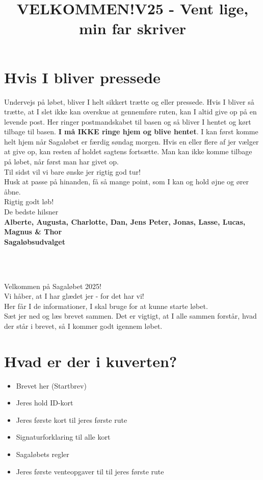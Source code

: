 \section{Hvis I bliver pressede}
Undervejs på løbet, bliver I helt sikkert trætte og eller pressede. Hvis I bliver så trætte, at I slet ikke kan overskue at gennemføre ruten, kan I altid give op på en levende post. Her ringer postmandskabet til basen og så bliver I hentet og kørt tilbage til basen. \textbf{I må IKKE ringe hjem og blive hentet}. I kan først komme helt hjem når Sagaløbet er færdig søndag morgen. Hvis en eller flere af jer vælger at give op, kan resten af holdet sagtens fortsætte. Man kan ikke komme tilbage på løbet, når først man har givet op.\\
\newline
Til sidst vil vi bare ønske jer rigtig god tur!\\
Husk at passe på hinanden, få så mange point, som I kan og hold øjne og ører åbne.\\
\newline
Rigtig godt løb!\\
\newline
\textcolor{søblå}{De bedste hilsner}\\
\textcolor{natblå}{\textbf{Alberte, Augusta, Charlotte, Dan, Jens Peter, Jonas, Lasse, Lucas, Magnus \& Thor}}\\
\textcolor{natblå}{\textbf{Sagaløbsudvalget}}\\
\newpage
\title{VELKOMMEN!}\\
\newline
\title{\textcolor{søblå}{V25 - Vent lige, min far skriver }}\\
\newline
Velkommen på Sagaløbet 2025!\\
Vi håber, at I har glædet jer - for det har vi!\\
Her får I de informationer, I skal bruge for at kunne starte løbet.\\
Sæt jer ned og læs brevet sammen. Det er vigtigt, at I alle sammen forstår, hvad der står i brevet, så I kommer godt igennem løbet.
\section{Hvad er der i kuverten?}
\begin{itemize}
    \item Brevet her (Startbrev)
    \item Jeres hold ID-kort
    \item Jeres første kort til jeres første rute
    \item Signaturforklaring til alle kort
    \item Sagaløbets regler
    \item Jeres første venteopgaver til til jeres første rute
\end{itemize}
